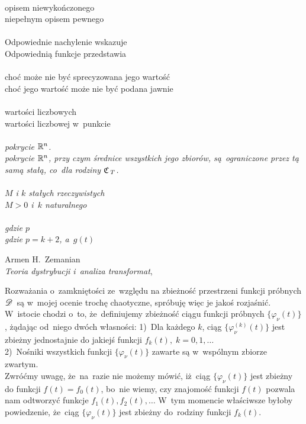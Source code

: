 \documentclass[a4paper,11pt]{article}
\begin{document}
\noindent
{} \\
\Jest  opisem niewykończonego \\
\Powin niepełnym opisem pewnego \\
 \\
\Jest  Odpowiednie nachylenie wskazuje \\
\Powin Odpowiednią funkcje przedstawia \\
 \\
\Jest  choć może nie być sprecyzowana jego wartość \\
\Powin choć jego wartość może nie być podana jawnie \\
 \\
\Jest  wartości liczbowych \\
\Powin wartości liczbowej w~punkcie \\
 \\
\Jest  \textit{pokrycie $\mathbb{R}^{ n }$.} \\
\Powin \textit{pokrycie $\mathbb{R}^{ n }$, przy czym średnice wszystkich jego
  zbiorów, są~ograniczone przez tą samą stałą, co~dla rodziny
  $\mathfrak{C}_{ \hspace{0.17em} T }$.} \\
 \\
\Jest  \textit{$M$ i $k$ stałych rzeczywistych} \\
\Powin \textit{$M > 0$ i~$k$ naturalnego} \\
 \\
\Jest  \textit{gdzie $p$} \\
\Powin \textit{gdzie $p = k + 2$, a~$g( t )$} \\







\newpage

{ %
  Armen H.~Zemanian \\
  \textit{Teoria dystrybucji i~analiza transformat},
  \cite{ZemanianTeoriaDystrybucji1969}}




\noindent
{} Rozważania o~zamkniętości ze~względu na zbieżność
przestrzeni funkcji próbnych $\mathcal{D}$~są w~mojej ocenie trochę
chaotyczne, spróbuję więc je jakoś rozjaśnić. W~istocie chodzi o~to,
że~definiujemy zbieżność ciągu funkcji próbnych
$\{ \varphi_{ \nu }( t ) \}$, żądając od~niego dwóch własności:
1)~Dla każdego $k$, ciąg $\{ \varphi_{ \nu }^{ ( k ) }( t ) \}$ jest
zbieżny jednostajnie do jakiejś funkcji
$f_{ k }( t ), \; k = 0, 1, \ldots$ \\
2)~Nośniki wszystkich funkcji $\{ \varphi_{ \nu }( t ) \}$ zawarte są
w~wspólnym zbiorze zwartym. \\
Zwróćmy uwagę, że~na~razie nie możemy mówić, iż~ciąg
$\{ \varphi_{ \nu }( t ) \}$ jest zbieżny do funkcji
$f( t ) = f_{ 0 }( t )$, bo~nie wiemy, czy znajomość funkcji $f( t )$
pozwala nam odtworzyć funkcje $f_{ 1 }( t ), f_{ 2 }( t ), \ldots$ W~tym
momencie właściwsze byłoby powiedzenie, że~ciąg
$\{ \varphi_{ \nu }( t ) \}$ jest zbieżny do~rodziny funkcji
$f_{ k }( t )$.
\end{document}
